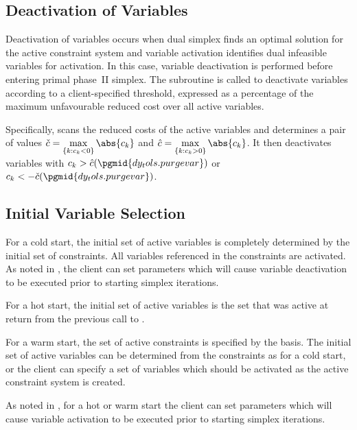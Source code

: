 \subsection{Deactivation of Variables}
\label{sec:VariableDeactivation}

Deactivation of variables occurs when dual simplex finds an optimal
solution for the active constraint system and variable activation identifies
dual infeasible variables for activation.
In this case, variable deactivation is performed before entering
primal phase~II simplex.
The subroutine  is called to deactivate variables
according to a client-specified threshold, expressed as a percentage of
the maximum unfavourable reduced cost over all active variables.

Specifically,  scans the reduced costs of the active
variables and determines a pair of values
$\displaystyle \check{c} = \max_{\{k : c_k < 0\}}\abs{c_k}$ and
$\displaystyle \hat{c} = \max_{\{k : c_k > 0\}}\abs{c_k}$.
It then deactivates variables with $c_k > \hat{c}(\pgmid{dy_tols.purgevar})$
or $c_k < -\check{c}(\pgmid{dy_tols.purgevar})$.

\subsection{Initial Variable Selection}

For a cold start, the initial set of active variables is completely determined
by the initial set of constraints.
All variables referenced in the constraints are activated.
As noted in , the client can set parameters which will
cause variable deactivation to be executed prior to starting simplex
iterations.

For a hot start, the initial set of active variables is the set that was
active at return from the previous call to .

For a warm start, the set of active constraints is specified by the basis.
The initial set of active variables can be determined from the constraints
as for a cold start, or the client can specify a set of variables which
should be activated as the active constraint system is created.

As noted in , for a hot or warm start the client can
set parameters which will cause variable activation to be executed prior
to starting simplex iterations.
